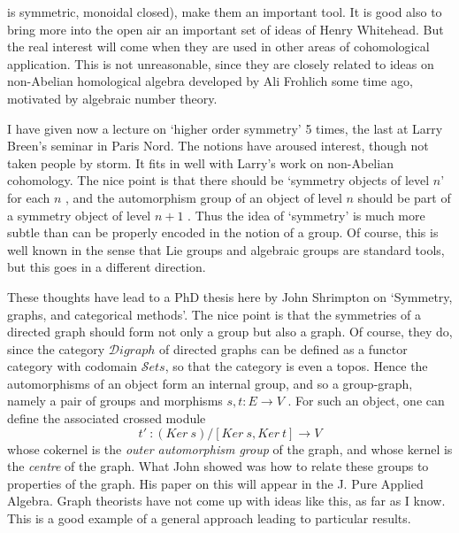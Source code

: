 is symmetric, monoidal closed), make them an important tool. It is good
also to bring more into the open air an important set of ideas of Henry
Whitehead. But the real interest will come when they are used in other
areas of cohomological application. This is not unreasonable, since they
are closely related to ideas on non-Abelian homological algebra developed by
Ali Frohlich some time ago, motivated by algebraic number theory.

I have given now a lecture on `higher order symmetry' 5 times, the last
at Larry Breen's seminar in Paris Nord. The notions have aroused interest,
though not taken people by storm. It fits in well with Larry's work on
non-Abelian cohomology. The nice point is that there should be `symmetry
objects of level $n$' for each $n$ , and the automorphism group of an object
of level $n$ should be part of a symmetry object of level $n+1$ . Thus the
idea of `symmetry' is much more subtle than can be properly encoded in the
notion of a group. Of course, this is well known in the sense that Lie
groups and algebraic groups are standard tools, but this goes in a different
direction.

These thoughts have lead to a PhD thesis here by John Shrimpton on
`Symmetry, graphs, and categorical methods'. The nice point is that the
symmetries of a directed graph should form not only a group but also a
graph. Of course, they do, since the category $\mathcal{D}igraph$ of directed graphs
can be defined as a functor category with codomain $\mathcal{S}ets$, so that the
category is even a topos. Hence the automorphisms of an object form an
internal group, and so a group-graph, namely a pair of groups and morphisms
$s,t : E \longrightarrow V$ . For such an object, one can define the associated crossed
module
\[ t' \ : (Ker\ s)/[Ker\ s,Ker\ t] \longrightarrow V \]
whose cokernel is the \textit{outer automorphism group} of the graph, and whose
kernel is the \textit{centre} of the graph. What John showed was how to relate these
groups to properties of the graph. His paper on this will appear in the J.
Pure Applied Algebra. Graph theorists have not come up with ideas like
this, as far as I know. This is a good example of a general approach
leading to particular results.

